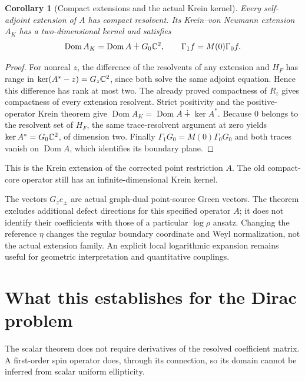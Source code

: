\documentclass[11pt]{article}
\newtheorem{corollary}[theorem]{Corollary}
\theoremstyle{remark}\newtheorem{remark}[theorem]{Remark}
\newcommand{\Dom}{\operatorname{Dom}}\newcommand{\dd}{\,d}
\begin{document}
\begin{corollary}[Compact extensions and the actual Krein kernel]\label{cor:krein}
Every self-adjoint extension of $A$ has compact resolvent. Its
Krein--von Neumann extension $A_K$ has a two-dimensional kernel and satisfies
\[
 \Dom A_K=\Dom A\dotplus G_0\C^2,
 \qquad \Gamma_1f=M(0)\Gamma_0f.
\]
\end{corollary}
\begin{proof}
For nonreal $z$, the difference of the resolvents of any extension and $H_F$
has range in $\ker(A^*-z)=G_z\mathbb C^2$, since both solve the same adjoint
equation. Hence this difference has rank at most two. The already proved
compactness of $R_z$ gives compactness of every extension resolvent.
Strict positivity and the positive-operator Krein theorem
\cite[Theorem 2.1, equation (2.8)]{krein} give
$\Dom A_K=\Dom A\dotplus\ker A^*$.
Because $0$ belongs to the resolvent set of $H_F$, the same trace-resolvent
argument at zero yields $\ker A^*=G_0\mathbb C^2$, of dimension two.
Finally $\Gamma_1G_0=M(0)\Gamma_0G_0$ and both traces vanish on $\Dom A$,
which identifies its boundary plane.
\end{proof}
This is the Krein extension of the corrected point restriction $A$.
The old compact-core operator still has an infinite-dimensional Krein kernel.

The vectors $G_ze_\pm$ are actual graph-dual point-source Green vectors.
The theorem excludes additional defect directions for this specified operator
$A$; it does not identify their coefficients with those of a particular
$\log\rho$ ansatz. Changing the reference $\eta$ changes the regular
boundary coordinate and Weyl normalization, not the actual extension family.
An explicit local logarithmic expansion remains useful for geometric
interpretation and quantitative couplings.

\section{What this establishes for the Dirac problem}\label{sec:dirac}
The scalar theorem does not require derivatives of the resolved coefficient
matrix. A first-order spin operator does, through its connection, so its
domain cannot be inferred from scalar uniform ellipticity.
\end{document}

